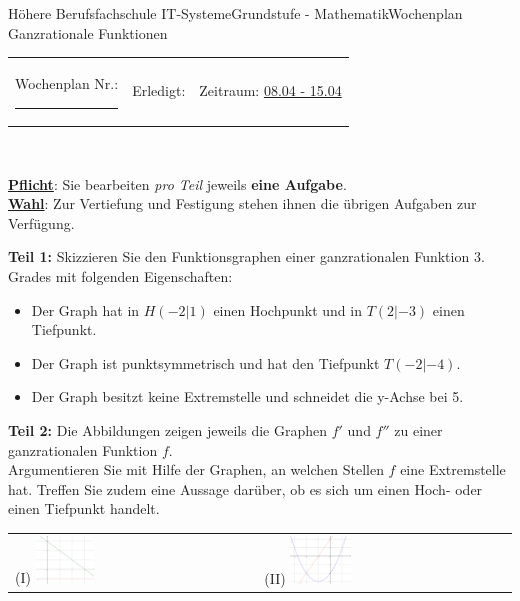 \documentclass[oneside,openany,headings=optiontotoc,11pt,numbers=noenddot]{scrreprt}
\begin{document}
	\begin{worksheet}{Höhere Berufsfachschule IT-Systeme}{Grundstufe - Mathematik}{Wochenplan Ganzrationale Funktionen}
		\noindent
		\begin{tabularx}{\textwidth}{XXl}
			Wochenplan Nr.: \rule{0.15\textwidth}{1pt} & Erledigt: & Zeitraum: \underline{08.04 - 15.04}
		\end{tabularx}\\
		\par\noindent
		\textbf{\underline{Pflicht}}: Sie bearbeiten \textit{pro Teil} jeweils \textbf{eine Aufgabe}.\\
		\underline{\textbf{Wahl}}: Zur Vertiefung und Festigung stehen ihnen die übrigen Aufgaben zur Verfügung.
		\begin{framed}
			\noindent
			\textbf{Teil 1:} Skizzieren Sie den Funktionsgraphen einer ganzrationalen Funktion 3. Grades mit folgenden Eigenschaften:
			\begin{itemize}
				\item[(I)] Der Graph hat in \(H(-2|1)\) einen Hochpunkt und in \(T(2|-3)\) einen Tiefpunkt.
				\item[(II)]  Der Graph ist punktsymmetrisch und hat den Tiefpunkt \(T(-2|-4)\).
				\item[(III)] Der Graph besitzt keine Extremstelle und schneidet die y-Achse bei 5.
			\end{itemize}
		\end{framed}
		\begin{framed}
			\noindent
			\textbf{Teil 2:} Die Abbildungen zeigen jeweils die Graphen \(f'\) und \(f''\) zu einer ganzrationalen Funktion \(f\).\\
			Argumentieren Sie mit Hilfe der Graphen, an welchen Stellen \(f\) eine Extremstelle hat. Treffen Sie zudem eine Aussage darüber, ob es sich um einen Hoch- oder einen Tiefpunkt handelt.\\
			\par\noindent
			\renewcommand{\arraystretch}{1.5}
			\begin{tabularx}{\textwidth}{M|M}
				(I) \includegraphics[width=0.25\textwidth, align=c]{../99_Bilder/WP/WP14_T21.png} & (II) \includegraphics[width=0.25\textwidth,align=c]{../99_Bilder/WP/WP14_T22.png}\\

\end{tabularx}
\end{framed}
\end{worksheet}
\end{document}
